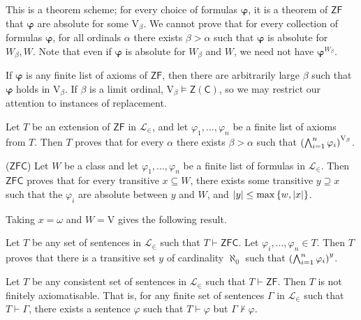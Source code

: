 \begin{remark}
    This is a theorem scheme; for every choice of formulas \( \bm\varphi \), it is a theorem of \( \mathsf{ZF} \) that \( \bm\varphi \) are absolute for some \( \mathrm{V}_\beta \).
    We cannot prove that for every collection of formulas \( \bm\varphi \), for all ordinals \( \alpha \) there exists \( \beta > \alpha \) such that \( \bm\varphi \) is absolute for \( W_\beta, W \).
    Note that even if \( \bm\varphi \) is absolute for \( W_\beta \) and \( W \), we need not have \( {\bm\varphi}^{W_\beta} \).

    If \( \bm\varphi \) is any finite list of axioms of \( \mathsf{ZF} \), then there are arbitrarily large \( \beta \) such that \( \bm\varphi \) holds in \( \mathrm{V}_\beta \).
    If \( \beta \) is a limit ordinal, \( \mathrm{V}_\beta \vDash \mathsf{Z}(\mathsf{C}) \), so we may restrict our attention to instances of replacement.
\end{remark}
\begin{corollary}
    Let \( T \) be an extension of \( \mathsf{ZF} \) in \( \mathcal L_\in \), and let \( \varphi_1, \dots, \varphi_n \) be a finite list of axioms from \( T \).
    Then \( T \) proves that for every \( \alpha \) there exists \( \beta > \alpha \) such that \( \qty(\bigwedge_{i=1}^n \varphi_i)^{\mathrm{V}_\beta} \).
\end{corollary}
\begin{corollary}
    (\( \mathsf{ZFC} \))
    Let \( W \) be a class and let \( \varphi_1, \dots, \varphi_n \) be a finite list of formulas in \( \mathcal L_\in \).
    Then \( \mathsf{ZFC} \) proves that for every transitive \( x \subseteq W \), there exists some transitive \( y \supseteq x \) such that the \( \varphi_i \) are absolute between \( y \) and \( W \), and \( \abs{y} \leq \max\qty{w, \abs{x}} \).
\end{corollary}
Taking \( x = \omega \) and \( W = \mathrm{V} \) gives the following result.
\begin{corollary}
    Let \( T \) be any set of sentences in \( \mathcal L_\in \) such that \( T \vdash \mathsf{ZFC} \).
    Let \( \varphi_i, \dots, \varphi_n \in T \).
    Then \( T \) proves that there is a transitive set \( y \) of cardinality \( \aleph_0 \) such that \( \qty(\bigwedge_{i=1}^n \varphi_i)^y \).
\end{corollary}
\begin{corollary}
    Let \( T \) be any consistent set of sentences in \( \mathcal L_\in \) such that \( T \vdash \mathsf{ZF} \).
    Then \( T \) is not finitely axiomatisable.
    That is, for any finite set of sentences \( \Gamma \) in \( \mathcal L_\in \) such that \( T \vdash \Gamma \), there exists a sentence \( \varphi \) such that \( T \vdash \varphi \) but \( \Gamma \nvdash \varphi \).
\end{corollary}
